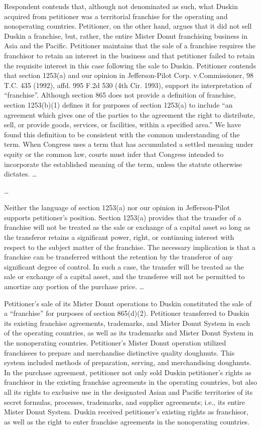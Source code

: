 \begin{select}
Respondent contends that, although not denominated as such, what Duskin acquired from petitioner was a territorial
franchise for the operating and nonoperating countries. Petitioner, on the other hand, argues that it did not sell Duskin
a franchise, but, rather, the entire Mister Donut franchising business in Asia and the Pacific. Petitioner maintains that
the sale of a franchise requires the franchisor to retain an interest in the business and that petitioner failed to retain the requisite interest in this case following the sale to Duskin. Petitioner contends that section 1253(a) and our opinion in Jefferson-Pilot Corp. v.\@ Commissioner, 98 T.C. 435 (1992), affd. 995 F.2d 530 (4th Cir. 1993), support its interpretation of ``franchise''. 
Although section 865 does not provide a definition of franchise, section 1253(b)(1) defines it for purposes of section
1253(a) to include ``an agreement which gives one of the parties to the agreement the right to distribute, sell, or provide
goods, services, or facilities, within a specified area.'' We have found this definition to be consistent with the common
understanding of the term. When Congress uses a term that has
accumulated a settled meaning under equity or the common law, courts must infer that Congress intended to incorporate
the established meaning of the term, unless the statute otherwise dictates. \ldots

\ldots

Neither the language of section 1253(a) nor our opinion in Jefferson-Pilot supports petitioner's position. Section
1253(a) provides that the transfer of a franchise will not be treated as the sale or exchange of a capital asset so long as
the transferor retains a significant power, right, or continuing interest with respect to the subject matter of the franchise.
The necessary implication is that a franchise can be transferred without the retention by the transferor of
any significant degree of control. In such a case, the transfer will be treated as the sale or exchange of a capital asset, and the transferee will not be permitted to amortize any portion of the purchase price. \ldots

Petitioner's sale of its Mister Donut operations to Duskin constituted the sale of a ``franchise'' for purposes of section
865(d)(2). Petitioner transferred to Duskin its existing franchise agreements, trademarks, and Mister Donut System
in each of the operating countries, as well as its trademarks and Mister Donut System in the nonoperating countries.
Petitioner's Mister Donut operation utilized franchisees to prepare and merchandise distinctive quality doughnuts. This
system included methods of preparation, serving, and merchandising doughnuts. In the purchase agreement, petitioner not
only sold Duskin petitioner's rights as franchisor in the existing franchise agreements in the operating countries, but also all its rights to exclusive use in the designated Asian and Pacific territories of its secret formulas, processes, trademarks, and supplier agreements; i.e., its entire Mister Donut System. Duskin received petitioner's existing rights as franchisor, as well as the right to enter franchise agreements in the nonoperating countries.


\end{select}
